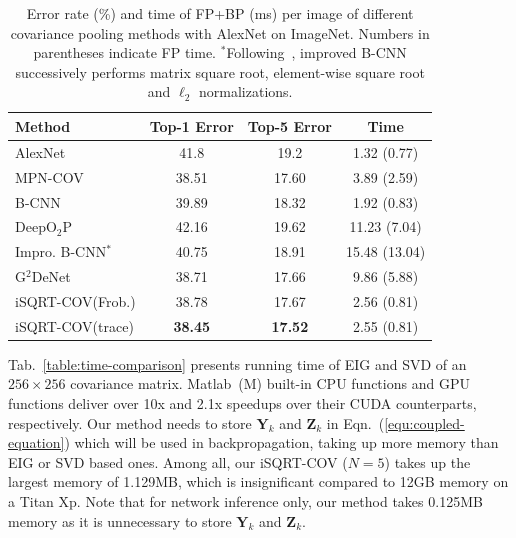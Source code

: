 \documentclass[10pt,twocolumn,letterpaper]{article}
\begin{document}
\begin{table}[t]
	\setlength\tabcolsep{4pt}
	\renewcommand{\baselinestretch}{1.05}
	\footnotesize
	\centering
	\begin{minipage}[t]{1.0\linewidth}
		\centering
		\begin{tabular}{|l|c|c|c|}
			\hline
			Method & Top-1 Error   &  Top-5 Error  & Time \\
			\hline
			\hline
			AlexNet~\cite{Krizhevsky2012ImageNet}       &  41.8     & 19.2  &  1.32 (0.77) \\
			\hline
			MPN-COV~\cite{Li_2017_ICCV}                           &  38.51 & 17.60 & 3.89 (2.59)\\
			B-CNN~\cite{lin2015bilinear}          &  39.89 & 18.32 & 1.92 (0.83)\\
			DeepO$_{2}$P~\cite{Ionescu_2015_ICCV} &  42.16 & 19.62  & 11.23 (7.04)\\
			Impro. B-CNN$^{*}$\cite{lin2017improved}     & 40.75         &  18.91  &  15.48 (13.04)  \\
			G$^2$DeNet~\cite{Wang_2017_CVPR}      &    38.71      & 17.66     &  9.86 (5.88) \\
			\hline
			\hline
			iSQRT-COV(Frob.)   &  38.78 &  17.67  & 2.56 (0.81)\\
			iSQRT-COV(trace) &  \textbf{38.45} &  \textbf{17.52} & 2.55 (0.81) \\
			\hline
		\end{tabular}
	\end{minipage}
	\renewcommand{\baselinestretch}{1.0}
	\caption{Error rate (\%) and time of FP+BP (ms) per image of different covariance pooling methods with AlexNet on ImageNet. Numbers in parentheses indicate FP time.  $^{*}$Following~\cite{lin2017improved}, improved B-CNN  successively  performs matrix square root, element-wise square root and $\ell_{2}$ normalizations.}
	\label{table:second-order-AlexNet}
\end{table}
Tab.~\ref{table:time-comparison}
presents  running time  of EIG and SVD of an $256\times 256$ covariance matrix.   Matlab~(M) built-in CPU functions and GPU functions deliver over 10x and 2.1x  speedups over their CUDA counterparts, respectively.  Our method needs to store $\mathbf{Y}_{k}$ and $\mathbf{Z}_{k}$ in Eqn.~(\ref{equ:coupled-equation}) which will be used in backpropagation, taking up more memory than EIG or SVD based ones. Among all,  our iSQRT-COV ($N=5$) takes up the largest memory of 1.129MB, which is insignificant compared to 12GB memory on a Titan Xp. Note that for network inference only, our method  takes  0.125MB memory as it is unnecessary to store  $\mathbf{Y}_{k}$ and $\mathbf{Z}_{k}$.
\end{document}

